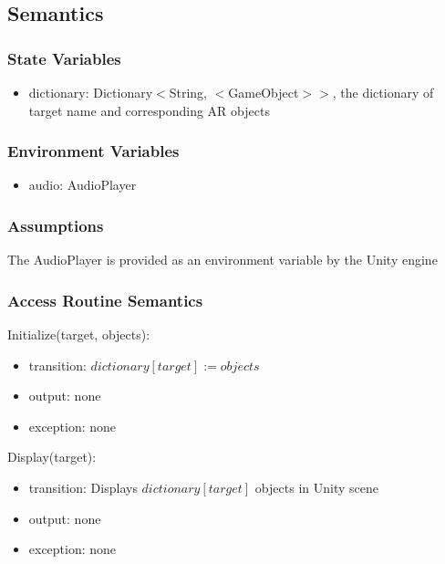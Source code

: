 \documentclass[12pt, titlepage]{article}
\begin{document}
\subsection{Semantics}

\subsubsection{State Variables}

\begin{itemize}
\item dictionary: Dictionary$<$String, $<$GameObject$>$$>$, the dictionary of target name and corresponding AR objects
\end{itemize}

\subsubsection{Environment Variables}

\begin{itemize}
\item audio: AudioPlayer
\end{itemize}

\subsubsection{Assumptions}

The AudioPlayer is provided as an environment variable by the Unity engine

\subsubsection{Access Routine Semantics}

\noindent Initialize(target, objects):
\begin{itemize}
\item transition: $dictionary[target] := objects$
\item output: none
\item exception: none
\end{itemize}

\noindent Display(target):
\begin{itemize}
\item transition: Displays $dictionary[target]$ objects in Unity scene
\item output: none
\item exception: none
\end{itemize}
\end{document}
